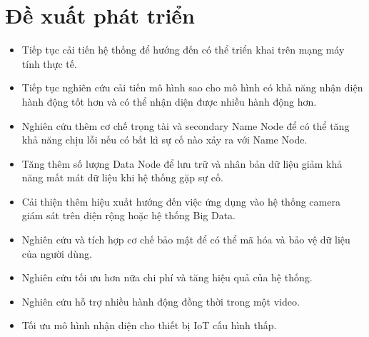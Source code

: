 \documentclass[../main.tex]{subfiles}
\begin{document}
\section{Đề xuất phát triển}
\begin{itemize}
        \item Tiếp tục cải tiến hệ thống để hướng đến có thể triển khai trên mạng máy tính thực tế.
        \item Tiếp tục nghiên cứu cải tiến mô hình sao cho mô hình có khả năng nhận diện hành động tốt hơn và có thể nhận diện được nhiều hành động hơn.
        \item Nghiên cứu thêm cơ chế trọng tài và secondary Name Node để có thể tăng khả năng chịu lỗi nếu có bất kì sự cố nào xảy ra với Name Node.
        \item Tăng thêm số lượng Data Node để lưu trữ và nhân bản dữ liệu giảm khả năng mất mát dữ liệu khi hệ thống gặp sự cố.
        \item Cải thiện thêm hiệu xuất hướng đến việc ứng dụng vào hệ thống camera giám sát trên diện rộng hoặc hệ thống Big Data.
        \item Nghiên cứu và tích hợp cơ chế bảo mật để có thể mã hóa và bảo vệ dữ liệu của người dùng.
        \item Nghiên cứu tối ưu hơn nữa chi phí và tăng hiệu quả của hệ thống.
        \item Nghiên cứu hỗ trợ nhiều hành động đồng thời trong một video.
        \item Tối ưu mô hình nhận diện cho thiết bị IoT cấu hình thấp.
\end{itemize}
\end{document}
